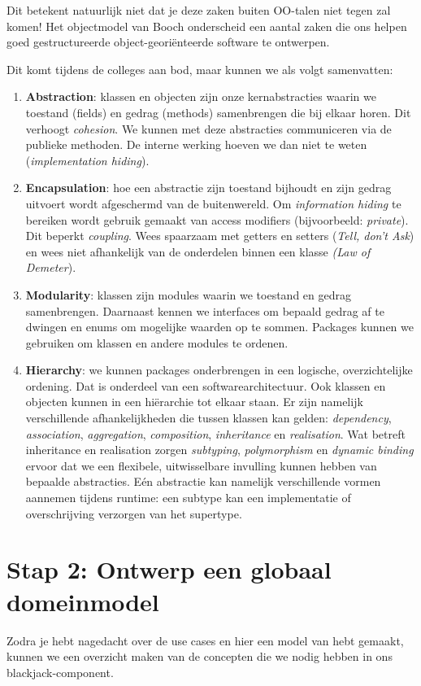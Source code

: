 Dit betekent natuurlijk niet dat je deze zaken buiten OO-talen niet tegen zal komen! 
Het objectmodel van Booch onderscheid een aantal zaken
die ons helpen goed gestructureerde object-georiënteerde software te ontwerpen.

Dit komt tijdens de colleges aan bod, maar kunnen we als volgt samenvatten:
\begin{enumerate}
    \item \textbf{Abstraction}: klassen en objecten zijn onze kernabstracties waarin we 
    toestand (fields) en gedrag (methods) samenbrengen die bij elkaar horen. Dit verhoogt \textit{cohesion}.
    We kunnen met deze abstracties communiceren via de publieke methoden. 
    De interne werking hoeven we dan niet te weten (\textit{implementation hiding}).
    \item \textbf{Encapsulation}: hoe een abstractie zijn toestand bijhoudt en zijn 
    gedrag uitvoert wordt afgeschermd van de buitenwereld. Om \textit{information hiding} te bereiken wordt 
    gebruik gemaakt van access modifiers (bijvoorbeeld: \textit{private}). 
    Dit beperkt \textit{coupling}. Wees spaarzaam met getters en setters (\textit{Tell, don't Ask}) 
    en wees niet afhankelijk van de onderdelen binnen een klasse \textit(\textit{Law of Demeter}).
    \item \textbf{Modularity}: klassen zijn modules waarin we toestand en gedrag samenbrengen. Daarnaast kennen 
    we interfaces om bepaald gedrag af te dwingen en enums om mogelijke waarden op te sommen. 
    Packages kunnen we gebruiken om klassen en andere modules te ordenen.
    \item \textbf{Hierarchy}: we kunnen packages onderbrengen in een logische, overzichtelijke ordening. Dat is onderdeel 
    van een softwarearchitectuur. Ook klassen en objecten kunnen in een hiërarchie tot elkaar staan. Er zijn namelijk 
    verschillende afhankelijkheden die tussen klassen kan gelden: \textit{dependency}, \textit{association}, \textit{aggregation},
    \textit{composition}, \textit{inheritance} en \textit{realisation}. Wat betreft inheritance en realisation zorgen 
    \textit{subtyping}, \textit{polymorphism} en \textit{dynamic binding} ervoor dat we een flexibele, uitwisselbare 
    invulling kunnen hebben van bepaalde abstracties. Eén abstractie kan namelijk verschillende vormen aannemen tijdens runtime:
    een subtype kan een implementatie of overschrijving verzorgen van het supertype.
\end{enumerate}

\section{Stap 2: Ontwerp een globaal domeinmodel}
Zodra je hebt nagedacht over de use cases en hier een model van hebt gemaakt,
kunnen we een overzicht maken van de concepten die we nodig hebben in ons blackjack-component.

